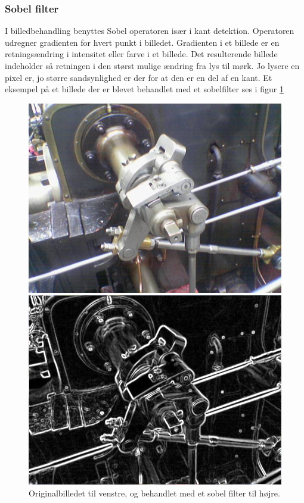 \subsubsection{Sobel filter}
I billedbehandling benyttes Sobel operatoren især i kant detektion. Operatoren udregner gradienten for hvert punkt i billedet. Gradienten i et billede er en retningsændring i intensitet eller farve i et billede. Det resulterende billede indeholder så retningen i den størst mulige ændring fra lys til mørk. Jo lysere en pixel er, jo større sandsynlighed er der for at den er en del af en kant. Et eksempel på et billede der er blevet behandlet med et sobelfilter ses i figur \ref{fig:premethod_sobelres}

\begin{figure}[H]
	\begin{minipage}[b]{0.5\linewidth}
		\centering
		\includegraphics[scale=0.25]{files/premethod/img/sobel1.PNG}
	\end{minipage}
	\hspace{0.5cm}
	\begin{minipage}[b]{0.5\linewidth}
		\centering
		\includegraphics[scale=0.25]{files/premethod/img/sobel2.PNG}
	\end{minipage}
	\caption{Originalbilledet til venstre, og behandlet med et sobel filter til højre.\label{fig:premethod_sobelres}}
\end{figure}

